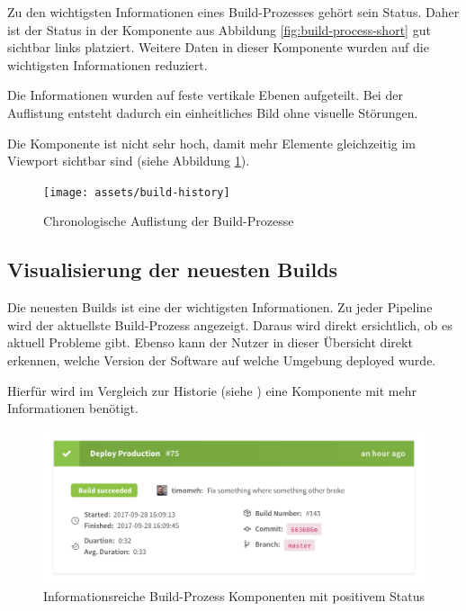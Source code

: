 Zu den wichtigsten Informationen eines Build-Prozesses gehört sein Status. Daher ist der Status in der Komponente aus Abbildung \ref{fig:build-process-short} gut sichtbar links platziert. Weitere Daten in dieser Komponente wurden auf die wichtigsten Informationen reduziert.

Die Informationen wurden auf feste vertikale Ebenen aufgeteilt. Bei der Auflistung entsteht dadurch ein einheitliches Bild ohne visuelle Störungen.

Die Komponente ist nicht sehr hoch, damit mehr Elemente gleichzeitig im Viewport sichtbar sind (siehe Abbildung \ref{fig:build-history}).

\begin{figure}[H]
  \caption{Chronologische Auflistung der Build-Prozesse}
  \label{fig:build-history}
  \centering
    \texttt{[image: assets/build-history]}
\end{figure}

\subsection{Visualisierung der neuesten Builds}

Die neuesten Builds ist eine der wichtigsten Informationen. Zu jeder Pipeline wird der aktuellste Build-Prozess angezeigt. Daraus wird direkt ersichtlich, ob es aktuell Probleme gibt. Ebenso kann der Nutzer in dieser Übersicht direkt erkennen, welche Version der Software auf welche Umgebung deployed wurde.

Hierfür wird im Vergleich zur Historie (siehe ) eine Komponente mit mehr Informationen benötigt.

\begin{figure}[h]
  \caption{Informationsreiche Build-Prozess Komponenten mit positivem Status}
  \label{fig:build-process-detail}
  \centering
    \includegraphics[width=\textwidth]{assets/build-detail-finished}
\end{figure}

